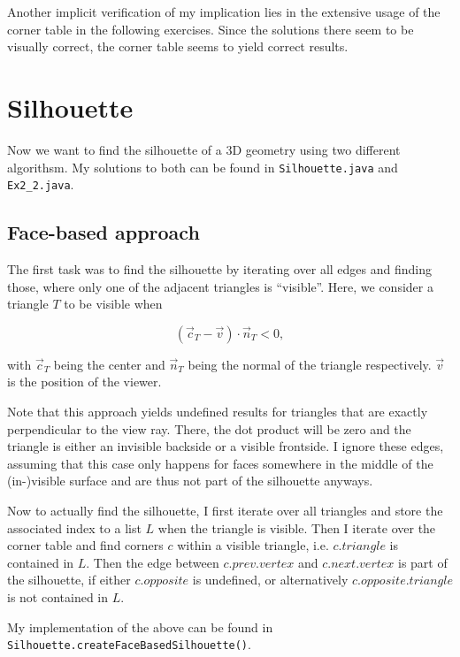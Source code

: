 \documentclass[a4paper,10pt,notitlepage]{scrreprt}
\begin{document}
Another implicit verification of my implication lies in the extensive usage of
the corner table in the following exercises. Since the solutions there seem to
be visually correct, the corner table seems to yield correct results.

\chapter{Silhouette}

Now we want to find the silhouette of a 3D geometry using two different
algorithsm. My solutions to both can be found in \texttt{Silhouette.java} and
\texttt{Ex2\_2.java}.

\section{Face-based approach}

The first task was to find the silhouette by iterating over all edges and
finding those, where only one of the adjacent triangles is ``visible''. Here, we
consider a triangle $T$ to be visible when

\begin{equation}
 (\vec{c}_T - \vec{v}) \cdot \vec{n}_T < 0,
\end{equation}

with $\vec{c}_T$ being the center and $\vec{n}_T$ being the normal of the
triangle respectively. $\vec{v}$ is the position of the viewer.

Note that this approach yields undefined results for triangles that are
exactly perpendicular to the view ray. There, the dot product will be zero and
the triangle is either an invisible backside or a visible frontside. I ignore
these edges, assuming that this case only happens for faces somewhere in the
middle of the (in-)visible surface and are thus not part of the silhouette
anyways.

Now to actually find the silhouette, I first iterate over all triangles and
store the associated index to a list $L$ when the triangle is visible. Then
I iterate over the corner table and find corners $c$ within a visible triangle,
i.e. $c.triangle$ is contained in $L$. Then the edge between $c.prev.vertex$
and $c.next.vertex$ is part of the silhouette, if either $c.opposite$ is
undefined, or alternatively $c.opposite.triangle$ is not contained in $L$.

My implementation of the above can be found in
\texttt{Silhouette.createFaceBasedSilhouette()}.
\end{document}
